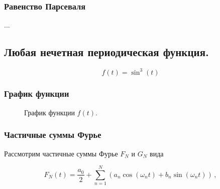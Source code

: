 \documentclass[a5paper, 10pt]{article}
\theoremstyle{definition}
\theoremstyle{plain}
\theoremstyle{remark}
\begin{document}
\subsubsection{Равенство Парсеваля}

...











\newpage
\subsection{Любая нечетная периодическая функция.}
\begin{equation}
f(t) = \sin^3(t)
\end{equation}

\subsubsection{График функции}
\begin{figure}[h]
\caption{График функции $f(t)$.}
\end{figure}

\subsubsection{Частичные суммы Фурье}
Рассмотрим частичные суммы Фурье $F_N$ и $G_N$ вида

\begin{equation}
F_N(t) = \frac{a_0}{2} + \sum  \limits_{n=1}^N \left( a_n \cos \left( \omega_n t \right) + b_n \sin \left( \omega_n t \right)  \right) \, ,
\end{equation}
\end{document}
